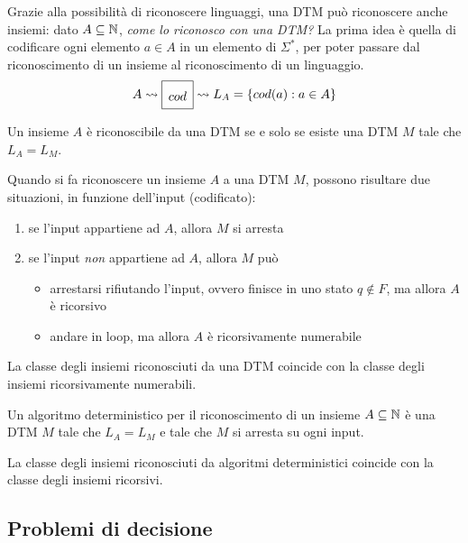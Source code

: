 Grazie alla possibilità di riconoscere linguaggi, una DTM può riconoscere anche insiemi: dato $A \subseteq \mathbb{N}$, \textit{come lo riconosco con una DTM?} La prima idea è quella di codificare ogni elemento $a \in A$ in un elemento di $\Sigma^\ast$, per poter passare dal riconoscimento di un insieme al riconoscimento di un linguaggio.
$$
\renewcommand{\arraystretch}{1.8}
A \rightsquigarrow \begin{array}{|c|}
	\hline
	cod \\
	\hline
\end{array}
\rightsquigarrow L_A = \{cod(a): a \in A\}
$$

Un insieme $A$ è riconoscibile da una DTM se e solo se esiste una DTM $M$ tale che $L_A = L_M$.

Quando si fa riconoscere un insieme $A$ a una DTM $M$, possono risultare due situazioni, in funzione dell'input (codificato):
\begin{enumerate}
	\item se l'input appartiene ad $A$, allora $M$ si arresta
	\item se l'input \textit{non} appartiene ad $A$, allora $M$ può 
	\begin{itemize}
		\item arrestarsi rifiutando l'input, ovvero finisce in uno stato $q \notin F$, ma allora $A$ è ricorsivo
		\item andare in loop, ma allora $A$ è ricorsivamente numerabile \\
	\end{itemize}
\end{enumerate}

\begin{theor}
	La classe degli insiemi riconosciuti da una DTM coincide con la classe degli insiemi ricorsivamente numerabili.
\end{theor}

Un algoritmo deterministico per il riconoscimento di un insieme $A \subseteq \mathbb{N}$ è una DTM $M$ tale che $L_A = L_M$ e tale che $M$ si arresta su ogni input.\\

\begin{theor}
	La classe degli insiemi riconosciuti da algoritmi deterministici coincide con la classe degli insiemi ricorsivi.
  \end{theor}


\subsection{Problemi di decisione}

